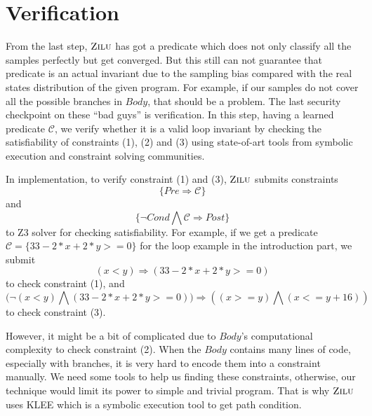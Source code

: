 
\section{Verification} %
\label{sec:verification}
From the last step, $\textsc{Zilu}$ has got a predicate which does not only classify all the samples perfectly but get converged.
But this still can not guarantee that predicate is an actual invariant due to the sampling bias compared with the real states distribution of the given program.
For example, if our samples do not cover all the possible branches in $Body$, that should be a problem.
The last security checkpoint on these ``bad guys'' is verification. 
In this step, having a learned predicate $\mathcal{C}$, we verify whether it is a valid loop invariant by
checking the satisfiability of constraints (1), (2) and (3) using state-of-art tools from symbolic execution and constraint solving communities.

In implementation, to verify constraint (1) and (3), 
$\textsc{Zilu}$ submits constraints $$\{Pre \Rightarrow \mathcal{C}\}$$ and $$\{\neg {Cond} \bigwedge \mathcal{C} \Rightarrow Post\}$$ to Z3 solver for checking satisfiability.
For example, if we get a predicate $\mathcal{C} = \{33-2*x+2*y>=0\}$
for the loop example in the introduction part, 
we submit 
$$(x<y) \Rightarrow (33-2*x+2*y>=0)$$
to check constraint (1), 
and 
$$\big(\neg(x<y) \bigwedge (33-2*x+2*y>=0)\big) \Rightarrow ((x >= y) \bigwedge (x <= y + 16))$$
to check constraint (3).

However, it might be a bit of complicated due to $Body$'s computational complexity to check constraint (2).
When the $Body$ contains many lines of code, especially with branches, it is very hard to encode them into a constraint manually.
We need some tools to help us finding these constraints, otherwise, our technique would limit its power to simple and trivial program. 
That is why $\textsc{Zilu}$ uses KLEE\cite{cadar2008klee} which is a symbolic execution tool to get path condition.





